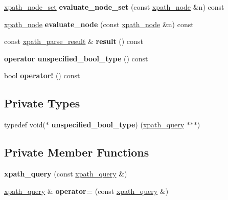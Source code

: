 \begin{DoxyCompactItemize}
\hyperlink{classpugi_1_1xpath__node__set}{xpath\+\_\+node\+\_\+set} {\bfseries evaluate\+\_\+node\+\_\+set} (const \hyperlink{classpugi_1_1xpath__node}{xpath\+\_\+node} \&n) const
\item 
\mbox{\label{classpugi_1_1xpath__query_af5f86dfcb06e7f7fb8387ad70b074f17}} 
\hyperlink{classpugi_1_1xpath__node}{xpath\+\_\+node} {\bfseries evaluate\+\_\+node} (const \hyperlink{classpugi_1_1xpath__node}{xpath\+\_\+node} \&n) const
\item 
\mbox{\label{classpugi_1_1xpath__query_ae0b665dd704cc3c2cc66ac8f2e278cdf}} 
const \hyperlink{structpugi_1_1xpath__parse__result}{xpath\+\_\+parse\+\_\+result} \& {\bfseries result} () const
\item 
\mbox{\label{classpugi_1_1xpath__query_a5f4403dd4804bbda772be1494c3ebce8}} 
{\bfseries operator unspecified\+\_\+bool\+\_\+type} () const
\item 
\mbox{\label{classpugi_1_1xpath__query_a53174c66de51f2c1611b867ec941c1a4}} 
bool {\bfseries operator!} () const
\end{DoxyCompactItemize}
\subsection*{Private Types}
\begin{DoxyCompactItemize}
\item 
\mbox{\label{classpugi_1_1xpath__query_a30495f41b22608922e533de85f254f61}} 
typedef void($\ast$ {\bfseries unspecified\+\_\+bool\+\_\+type}) (\hyperlink{classpugi_1_1xpath__query}{xpath\+\_\+query} $\ast$$\ast$$\ast$)
\end{DoxyCompactItemize}
\subsection*{Private Member Functions}
\begin{DoxyCompactItemize}
\item 
\mbox{\label{classpugi_1_1xpath__query_ac380b5908733799ae2688672c1b88fd7}} 
{\bfseries xpath\+\_\+query} (const \hyperlink{classpugi_1_1xpath__query}{xpath\+\_\+query} \&)
\item 
\mbox{\label{classpugi_1_1xpath__query_abc67091b5d96ed2107dc3ba4f5735a60}} 
\hyperlink{classpugi_1_1xpath__query}{xpath\+\_\+query} \& {\bfseries operator=} (const \hyperlink{classpugi_1_1xpath__query}{xpath\+\_\+query} \&)
\end{DoxyCompactItemize}
